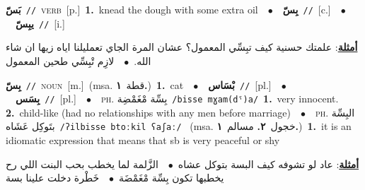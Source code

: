 \documentclass[10pt,a4paper,twoside]{article} %
\begin{document}
\begin{multicols}{2}
{\setlength\topsep{0pt}\textbf{\foreignlanguage{arabic}{بَسّ}}\ {\color{gray}\texttt{//}\color{black}}\ \textsc{verb}\ [p.]\ \textbf{1.}~knead the dough with some extra oil\ \ $\bullet$\ \ \setlength\topsep{0pt}\textbf{\foreignlanguage{arabic}{بِسّ}}\ {\color{gray}\texttt{//}\color{black}}\ [c.]\ \ $\bullet$\ \ \setlength\topsep{0pt}\textbf{\foreignlanguage{arabic}{يبِسّ}}\ {\color{gray}\texttt{//}\color{black}}\ [i.]\  \begin{flushright}\color{gray}\foreignlanguage{arabic}{\textbf{\underline{\foreignlanguage{arabic}{أمثلة}}}: علمتك حسنية كيف تبِسِّي المعمول؟ عشان المرة الجاي تعمليلنا اياه زيها ان شاء الله.\ $\bullet$\ \  لازِم تْبِسِّي طحين المعمول}\end{flushright}\color{black}} \vspace{2mm}

{\setlength\topsep{0pt}\textbf{\foreignlanguage{arabic}{بِسّ}}\ {\color{gray}\texttt{//}\color{black}}\ \textsc{noun}\ [m.]\ \color{gray}(msa. \foreignlanguage{arabic}{قطة}~\foreignlanguage{arabic}{\textbf{١.}})\color{black}\ \textbf{1.}~cat\ \ $\bullet$\ \ \setlength\topsep{0pt}\textbf{\foreignlanguage{arabic}{بْسَاس}}\ {\color{gray}\texttt{//}\color{black}}\ [pl.]\ \ $\bullet$\ \ \setlength\topsep{0pt}\textbf{\foreignlanguage{arabic}{بِسَس}}\ {\color{gray}\texttt{//}\color{black}}\ [pl.]\ \ $\bullet$\ \ \textsc{ph.} \color{gray} \foreignlanguage{arabic}{بِسِّة مْغَمْضِة}\color{black}\ {\color{gray}\texttt{/{\sffamily bisse mɣam(dˤ)a}/}\color{black}}\ \textbf{1.}~very innocent.  \textbf{2.}~child-like (had no relationships with any men before marriage)\ \ $\bullet$\ \ \textsc{ph.} \color{gray} \foreignlanguage{arabic}{البِسِّة بتَوكِل عَشَاه}\color{black}\ {\color{gray}\texttt{/{\sffamily ʔilbisse btoːkil ʕaʃaː}/}\color{black}}\ \color{gray} (msa. \foreignlanguage{arabic}{خجول}~\foreignlanguage{arabic}{\textbf{٢.}}  \foreignlanguage{arabic}{مسالم}~\foreignlanguage{arabic}{\textbf{١.}})\color{black}\ \textbf{1.}~it is an idiomatic expression that means that sb is very peaceful or shy\  \begin{flushright}\color{gray}\foreignlanguage{arabic}{\textbf{\underline{\foreignlanguage{arabic}{أمثلة}}}: عاد لو تشوفه كيف البسة بتوكل عشاه\ $\bullet$\ \  الزَّلمة لما يخطب بحب البنت اللي رح يخطبها تكون بِسِّة مْغَمْضَة\ $\bullet$\ \  خَطْرة دخلت علينا بسة}\end{flushright}\color{black}} \vspace{2mm}


\end{multicols}
\end{document}
